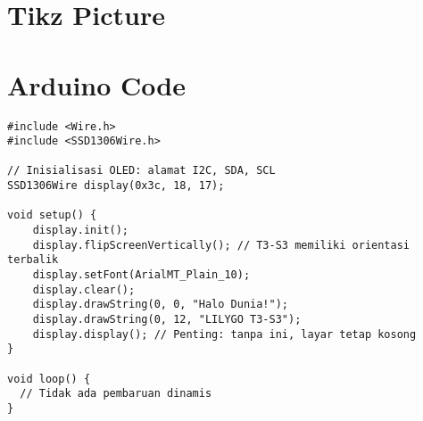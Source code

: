 \section{Tikz Picture}
\begin{minipage}{0.49\linewidth}
    \begin{flushright}
    \end{flushright}

\end{minipage}

\section{Arduino Code}

\begin{minipage}{0.99\linewidth}
    \begin{lstlisting}[style=ArduinoStyle,caption={Program OLED Minimalis},label={lst:oled-simple}]
#include <Wire.h>
#include <SSD1306Wire.h>

// Inisialisasi OLED: alamat I2C, SDA, SCL
SSD1306Wire display(0x3c, 18, 17);

void setup() {
    display.init();
    display.flipScreenVertically(); // T3-S3 memiliki orientasi terbalik
    display.setFont(ArialMT_Plain_10);
    display.clear();
    display.drawString(0, 0, "Halo Dunia!");
    display.drawString(0, 12, "LILYGO T3-S3");
    display.display(); // Penting: tanpa ini, layar tetap kosong
}

void loop() {
  // Tidak ada pembaruan dinamis
}
\end{lstlisting}
\end{minipage}

